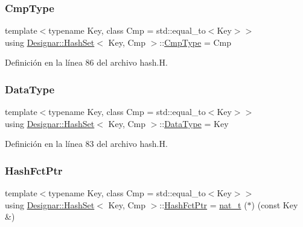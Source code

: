 \subsubsection{\texorpdfstring{Cmp\+Type}{CmpType}}
{\footnotesize\ttfamily template$<$typename Key, class Cmp = std\+::equal\+\_\+to$<$\+Key$>$$>$ \\
using \hyperlink{class_designar_1_1_hash_set}{Designar\+::\+Hash\+Set}$<$ Key, Cmp $>$\+::\hyperlink{class_designar_1_1_hash_set_ad0ab040392888a3320d2d72d1ead9968}{Cmp\+Type} =  Cmp}



Definición en la línea 86 del archivo hash.\+H.

\mbox{\label{class_designar_1_1_hash_set_af75f5917c5f53891a4129bd77d5d2906}} 
\subsubsection{\texorpdfstring{Data\+Type}{DataType}}
{\footnotesize\ttfamily template$<$typename Key, class Cmp = std\+::equal\+\_\+to$<$\+Key$>$$>$ \\
using \hyperlink{class_designar_1_1_hash_set}{Designar\+::\+Hash\+Set}$<$ Key, Cmp $>$\+::\hyperlink{class_designar_1_1_hash_set_af75f5917c5f53891a4129bd77d5d2906}{Data\+Type} =  Key}



Definición en la línea 83 del archivo hash.\+H.

\mbox{\label{class_designar_1_1_hash_set_a7a8b0a4970519ebc9ccc1ad247d0639f}} 
\subsubsection{\texorpdfstring{Hash\+Fct\+Ptr}{HashFctPtr}}
{\footnotesize\ttfamily template$<$typename Key, class Cmp = std\+::equal\+\_\+to$<$\+Key$>$$>$ \\
using \hyperlink{class_designar_1_1_hash_set}{Designar\+::\+Hash\+Set}$<$ Key, Cmp $>$\+::\hyperlink{class_designar_1_1_hash_set_a7a8b0a4970519ebc9ccc1ad247d0639f}{Hash\+Fct\+Ptr} =  \hyperlink{namespace_designar_aa72662848b9f4815e7bf31a7cf3e33d1}{nat\+\_\+t} ($\ast$) (const Key \&)}



